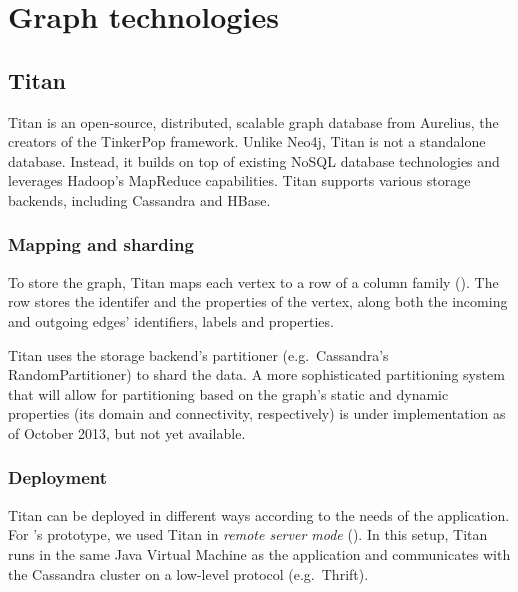 

\section{Graph technologies}

\subsection{Titan}
\label{subsec:titan}

Titan is an open-source, distributed, scalable graph database from Aurelius, the creators of the TinkerPop framework. Unlike Neo4j, Titan is not a standalone database. Instead, it builds on top of existing NoSQL database technologies and leverages Hadoop's MapReduce capabilities. Titan supports various storage backends, including Cassandra and HBase.
 

\subsubsection{Mapping and sharding}

To store the graph, Titan maps each vertex to a row of a column family (). The row stores the identifer and the properties of the vertex, along both the incoming and outgoing edges' identifiers, labels and properties.

Titan uses the storage backend's partitioner (e.g.\ Cassandra's RandomPartitioner) to shard the data. A more sophisticated partitioning system that will allow for partitioning based on the graph's static and dynamic properties (its domain and connectivity, respectively) is under implementation as of October 2013, but not yet available.


\subsubsection{Deployment}

Titan can be deployed in different ways according to the needs of the application. For \iqd's prototype, we used Titan in \textit{remote server mode} (). In this setup, Titan runs in the same Java Virtual Machine as the application and communicates with the Cassandra cluster on a low-level protocol (e.g.\ Thrift).

